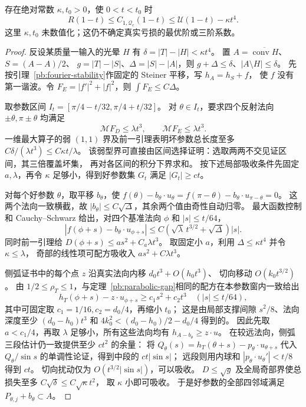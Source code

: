\begin{theorem}[全体常数的四阶亏损]\label{pb:quartic-gap}
存在绝对常数 $\kappa,t_0>0$，使 $0<t<t_0$ 时
\[
 R(1-t)\le C_{1,\mathcal Q_c}(1-t)
 \le\mathcal U(1-t)-\kappa t^4.
\]
这里 $\kappa,t_0$ 未数值化；这仍不确定真实亏损的最优阶或三阶系数。
\end{theorem}
\begin{proof}
反设某质量一输入的光晕 $H$ 有
$\delta=|T|-|H|<\kappa t^4$。
置 $A=\overline{\operatorname{conv}H}$、$S=(A-A)/2$、
$g=|T|-|S|$、$\Delta=|S|-|A|$，则
$g+\Delta\le\delta$、$|A\setminus H|\le\delta$。
先按引理~\ref{pb:fourier-stability}作固定的 Steiner 平移，写 $h_A=h_S+f$，
使 $f$ 没有第一谐波。令 $F_E=|f'|^2+|f|^2$，则 $\int F_E\le C\Delta$。

取参数区间 $I_t=[\pi/4-t/32,\pi/4+t/32]$。
对 $\theta\in I_t$，要求四个反射法向 $\pm\theta,\pi\pm\theta$ 均满足
\[
 \mathcal M F_D\le\lambda t^3,\qquad\mathcal M F_E\le\lambda t^3.
\]
一维最大算子的弱 $(1,1)$ 界及前一引理表明坏参数总长度至多
$C\delta/(\lambda t^3)\le C\kappa t/\lambda$。
该弱型界可直接由区间选择证明：选取两两不交见证区间，其三倍覆盖坏集，
再对各区间的积分下界求和。
按下述局部吸收条件先固定 $a,\lambda$，再令 $\kappa$ 足够小，得到好参数集 $G_t$ 满足
$|G_t|\ge c t$。

对每个好参数 $\theta$，取平移 $b_\theta$，使
$f(\theta)-b_\theta\cdot u_\theta=f(\pi-\theta)-b_\theta\cdot u_{\pi-\theta}=0$。
这两个法向一致横截，故 $|b_\theta|\le C\sqrt\Delta$，其余两个值由奇性自动归零。
最大函数控制和 Cauchy--Schwarz 给出，对四个基准法向 $\phi$ 和 $|s|\le t/64$，
\[
 |f(\phi+s)-b_\theta\cdot u_{\phi+s}|
 \le C(\sqrt\lambda\,t^{3/2}+\sqrt\Delta)|s|.
\]
同时前一引理给 $D(\phi+s)\le as^2+C_a\lambda t^3$。
取固定小 $a$，利用 $\Delta\le\kappa t^4$ 并令 $\kappa\le\lambda$，
奇部的线性项可配方吸收入 $as^2+C\lambda t^3$。

侧弧证书中的每个点 $z$ 沿真实法向内移 $d_0t^3+O(h_0t^3)$、
切向移动 $O(k_0t^{3/2})$。
由 $1/2\le\rho_T\le1$，与定理~\ref{pb:parabolic-gap}相同的配方在本参数窗内一致给出
\[
 h_T(\phi+s)-z\cdot u_{\phi+s}\ge c_1s^2+c_2t^3\quad(|s|\le t/64),
\]
其中可固定取 $c_1=1/16,c_2=d_0/4$，再缩小 $t_0$；
这是由局部支撑间隙 $s^2/8$、法向深度至少 $(d_0-h_0)t^3$ 和
$4k_0^2<(d_0-h_0)/2-d_0/4$ 得到的。
因此先取 $a<c_1/4$，再取 $\lambda$ 足够小，所有这些法向均有 $h_{A-b_\theta}\ge z\cdot u$。
在较远法向，侧弧三段估计仍一致提供至少 $ct^2$ 的余量：
将 $Q_\theta(s)=h_T(\theta+s)-p_\theta\cdot u_{\theta+s}$ 代入
$Q_\theta/\sin s$ 的单调性论证，得到中段的 $ct|\sin s|$；
远段则用内球和 $|p_\theta\cdot u_\theta'|<t/8$ 得到 $ct$。
切向扰动仅为 $O(t^{3/2}|\sin s|)$，可以吸收。
$D\le\sqrt g$ 及全局奇部界使总损失至多 $C\sqrt\delta\le C\sqrt\kappa t^2$，
取 $\kappa$ 小即可吸收。
于是好参数的全部四邻域满足 $P_{\theta,j}+b_\theta\subset A$。


\end{proof}
